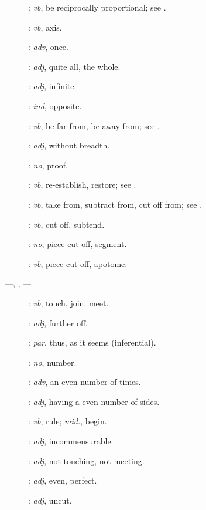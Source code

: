 {\begin{description}
\item[]: {\em vb}, be reciprocally proportional; see .
\item []: {\em vb}, axis.
\item[]: {\em adv}, once.
\item[]: {\em adj}, quite all, the whole.
\item[]: {\em adj}, infinite.
\item[]: {\em ind}, opposite.
\item[]: {\em vb}, be far from, be away from; see .
\item[]: {\em adj}, without breadth.
\item[]: {\em no}, proof.
\item[]: {\em vb}, re-establish, restore; see .
\item[]: {\em vb}, take from, subtract from, cut off from; see .
\item[]: {\em vb}, cut off, subtend.
\item[]: {\em no}, piece cut off, segment.
\item[]: {\em vb}, piece cut off, apotome.
\item[ ---, , ---]: {\em vb},  touch, join, meet.
\item[]: {\em adj}, further off.
\item[]: {\em par}, thus, as it seems (inferential).
\item []: {\em no}, number.
\item[]: {\em adv}, an even number of times.
\item[]: {\em adj}, having a even number of sides.
\item[]: {\em vb},
rule; {\em mid.}, begin.
\item[]: {\em adj}, incommensurable.
\item[]: {\em adj}, not touching, not meeting.
\item[]: {\em adj}, even, perfect.
\item[]: {\em adj}, uncut.

\end{description}}
